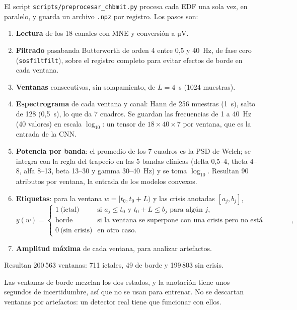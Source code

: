 El script \texttt{scripts/preprocesar\_chbmit.py} procesa cada EDF una sola vez, en paralelo, y guarda un
archivo \texttt{.npz} por registro. Los pasos son:
\begin{enumerate}
  \item \textbf{Lectura} de los 18 canales con MNE y conversión a µV.
  \item \textbf{Filtrado} pasabanda Butterworth de orden 4 entre 0,5 y 40~Hz, de fase cero
        (\texttt{sosfiltfilt}), sobre el registro completo para evitar efectos de borde en cada ventana.
  \item \textbf{Ventanas} consecutivas, sin solapamiento, de $L = 4$~s (1024 muestras).
  \item \textbf{Espectrograma} de cada ventana y canal: Hann de 256 muestras (1~s), salto de 128 (0,5~s), lo que
        da 7 cuadros. Se guardan las frecuencias de 1 a 40~Hz (40 valores) en escala $\log_{10}$: un tensor de
        $18\times40\times7$ por ventana, que es la entrada de la CNN.
  \item \textbf{Potencia por banda}: el promedio de los 7 cuadros es la PSD de Welch; se integra con la regla del
        trapecio en las 5 bandas clínicas (delta 0,5--4, theta 4--8, alfa 8--13, beta 13--30 y gamma 30--40~Hz) y
        se toma $\log_{10}$. Resultan 90 atributos por ventana, la entrada de los modelos convexos.
  \item \textbf{Etiquetas}: para la ventana $w = [t_0, t_0 + L)$ y las crisis anotadas $[a_j, b_j]$,
        \begin{equation}
          y(w) =
          \begin{cases}
            1 \ \text{(ictal)} & \text{si } a_j \le t_0 \text{ y } t_0 + L \le b_j \text{ para algún } j, \\
            \text{borde} & \text{si la ventana se superpone con una crisis pero no está contenida}, \\
            0 \ \text{(sin crisis)} & \text{en otro caso.}
          \end{cases}
        \end{equation}
  \item \textbf{Amplitud máxima} de cada ventana, para analizar artefactos.
\end{enumerate}
Resultan 200\,563 ventanas: 711 ictales, 49 de borde y 199\,803 sin crisis.

Las ventanas de borde mezclan los dos estados, y la anotación tiene unos segundos de incertidumbre, así que no se
usan para entrenar. No se descartan ventanas por artefactos: un detector real tiene que funcionar con ellos.

